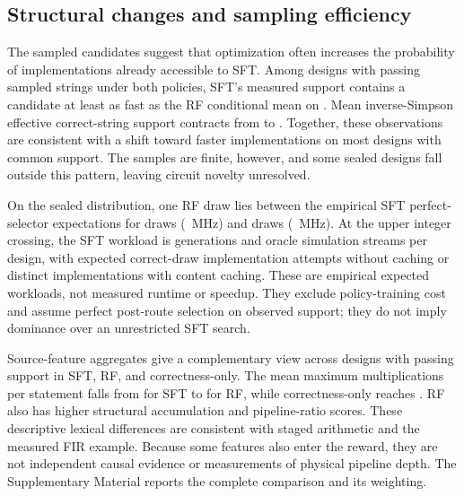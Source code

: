 

\subsection{Structural changes and sampling efficiency}
\label{sec:mechanism}

The sampled candidates suggest that optimization often increases the
probability of implementations already accessible to SFT. Among
 designs with passing sampled
strings under both policies, SFT's measured support contains a
candidate at least as fast as the RF conditional mean on
.  Mean inverse-Simpson
effective correct-string support contracts from
 to
. Together, these observations
are consistent with a shift toward faster implementations on most designs
with common support. The samples are finite, however, and some sealed designs
fall outside this pattern, leaving circuit novelty unresolved.

On the sealed distribution, one RF draw lies between the empirical SFT
perfect-selector expectations for  draws
(~MHz) and
 draws
(~MHz).  At the upper integer crossing, the
SFT workload is  generations and
 oracle simulation streams per design, with
 expected correct-draw implementation
attempts without caching or 
distinct implementations with content caching.  These are empirical expected
workloads, not measured runtime or speedup.  They exclude policy-training cost
and assume perfect post-route selection on observed support; they do not imply
dominance over an unrestricted SFT search.

Source-feature aggregates give a complementary view across
 designs with passing support in SFT, RF, and
correctness-only. The mean maximum multiplications per statement falls from
 for SFT to
 for RF, while correctness-only reaches
. RF also has higher structural
accumulation and pipeline-ratio scores. These descriptive lexical differences
are consistent with staged arithmetic and the measured FIR example. Because
some features also enter the reward, they are not independent causal evidence
or measurements of physical pipeline depth. The Supplementary Material reports
the complete comparison and its weighting.

